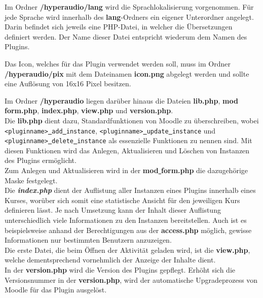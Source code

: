 Im Ordner \textbf{/hyperaudio/lang} wird die Sprachlokalisierung vorgenommen. Für jede Sprache wird innerhalb des \textbf{lang}-Ordners ein eigener Unterordner angelegt. Darin befindet sich jeweils eine PHP-Datei, in welcher die Übersetzungen definiert werden. Der Name dieser Datei entspricht wiederum dem Namen des Plugins.

Das Icon, welches für das Plugin  verwendet werden soll, muss im Ordner \textbf{/hyperaudio/pix} mit dem Dateinamen \textbf{icon.png} abgelegt werden und sollte eine Auflösung von 16x16 Pixel besitzen.

Im Ordner \textbf{/hyperaudio} liegen darüber hinaus die Dateien \textbf{lib.php}, \textbf{mod\underline{{ }}form.php}, \textbf{index.php}, \textbf{view.php} und \textbf{version.php}.\\
Die \textbf{lib.php} dient dazu, Standardfunktionen von Moodle zu überschreiben, wobei \mbox{\texttt{<pluginname>\underline{{ }}add\underline{{ }}instance}}, \texttt{<pluginname>\underline{{ }}update\underline{{ }}instance} und \texttt{<pluginname>\underline{{ }}delete\underline{{ }}instance} als essenzielle Funktionen zu nennen sind. Mit diesen Funktionen wird das Anlegen, Aktualisieren und Löschen von Instanzen des Plugins ermöglicht.\\
Zum Anlegen und Aktualisieren wird in der \textbf{mod\underline{{ }}form.php} die dazugehörige Maske festgelegt.\\
Die \textbf{\textit{index.php}} dient der Auflistung aller Instanzen eines Plugins innerhalb eines Kurses, worüber sich somit eine statistische Ansicht für den jeweiligen Kurs definieren lässt. Je nach Umsetzung kann der Inhalt dieser Auflistung unterschiedlich viele Informationen zu den Instanzen bereitstellen. Auch ist es beispielsweise anhand der Berechtigungen aus der \textbf{access.php} möglich, gewisse Informationen nur bestimmten Benutzern anzuzeigen.\\
Die erste Datei, die beim Öffnen der Aktivität geladen wird, ist die \textbf{view.php}, welche dementsprechend vornehmlich der Anzeige der Inhalte dient.\\
In der \textbf{version.php} wird die Version des Plugins gepflegt. Erhöht sich die Versionsnummer in der \textbf{version.php}, wird der automatische Upgradeprozess von Moodle für das Plugin ausgelöst.

